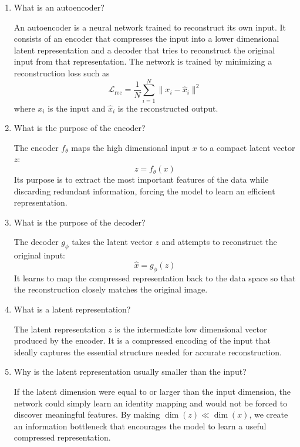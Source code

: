 \documentclass[10pt]{article}
\begin{document}
\begin{enumerate}

\item What is an autoencoder?

An autoencoder is a neural network trained to reconstruct its own input. It consists of an encoder that compresses the input into a lower dimensional latent representation and a decoder that tries to reconstruct the original input from that representation. The network is trained by minimizing a reconstruction loss such as
\[
\mathcal{L}_{\text{rec}} = \frac{1}{N}\sum_{i=1}^{N}\|x_i - \hat{x}_i\|^2
\]
where \(x_i\) is the input and \(\hat{x}_i\) is the reconstructed output.\\

\item What is the purpose of the encoder?

The encoder \(f_\theta\) maps the high dimensional input \(x\) to a compact latent vector \(z\):
\[
z = f_\theta(x)
\]
Its purpose is to extract the most important features of the data while discarding redundant information, forcing the model to learn an efficient representation.\\

\item What is the purpose of the decoder?

The decoder \(g_\phi\) takes the latent vector \(z\) and attempts to reconstruct the original input:
\[
\hat{x} = g_\phi(z)
\]
It learns to map the compressed representation back to the data space so that the reconstruction closely matches the original image.\\

\item What is a latent representation?

The latent representation \(z\) is the intermediate low dimensional vector produced by the encoder. It is a compressed encoding of the input that ideally captures the essential structure needed for accurate reconstruction.\\

\item Why is the latent representation usually smaller than the input?

If the latent dimension were equal to or larger than the input dimension, the network could simply learn an identity mapping and would not be forced to discover meaningful features. By making \(\dim(z) \ll \dim(x)\), we create an information bottleneck that encourages the model to learn a useful compressed representation.\\


\end{enumerate}
\end{document}
